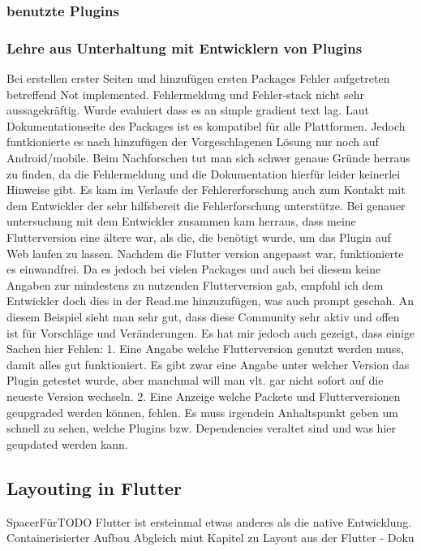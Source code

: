 \subsubsection{benutzte Plugins}
\subsubsection{Lehre aus Unterhaltung mit Entwicklern von Plugins}
Bei erstellen erster Seiten und hinzufügen ersten Packages Fehler aufgetreten betreffend Not implemented. Fehlermeldung und Fehler-stack nicht sehr aussagekräftig. Wurde evaluiert dass es an simple gradient text lag. Laut Dokumentationseite des Packages ist es kompatibel für alle Plattformen. Jedoch funtkionierte es nach hinzufügen der Vorgeschlagenen Lösung nur noch auf Android/mobile. Beim Nachforschen tut man sich schwer genaue Gründe herraus zu finden, da die Fehlermeldung und die Dokumentation hierfür leider keinerlei Hinweise gibt. 
Es kam im Verlaufe der Fehlererforschung auch zum Kontakt mit dem Entwickler der sehr hilfsbereit die Fehlerforschung unterstütze.
Bei genauer untersuchung mit dem Entwickler zusammen kam herraus, dass meine Flutterversion eine ältere war, als die, die benötigt wurde, um das Plugin auf Web laufen zu lassen. Nachdem die Flutter version angepasst war, funktionierte es einwandfrei. Da es jedoch bei vielen Packages und auch bei diesem keine Angaben zur mindestens zu nutzenden Flutterversion gab, empfohl ich dem Entwickler doch dies in der Read.me hinzuzufügen, was auch prompt geschah. 
An diesem Beispiel sieht man sehr gut, dass diese Community sehr aktiv und offen ist für Vorschläge und Veränderungen.
Es hat mir jedoch auch gezeigt, dass einige Sachen hier Fehlen:
1. Eine Angabe welche Flutterversion genutzt werden muss, damit alles gut funktioniert. Es gibt zwar eine Angabe unter welcher Version das Plugin getestet wurde, aber manchmal will man vlt. gar nicht sofort auf die neueste Version wechseln.
2. Eine Anzeige welche Packete und Flutterversionen geupgraded werden können, fehlen. Es muss irgendein Anhaltspunkt geben um schnell zu sehen, welche Plugins bzw. Dependencies veraltet sind und was hier geupdated werden kann.


\subsection{Layouting in Flutter}
SpacerFürTODO
Flutter ist ersteinmal etwas anderes als die native Entwicklung. 
Containerisierter Aufbau Abgleich miut Kapitel zu Layout aus der Flutter - Doku

